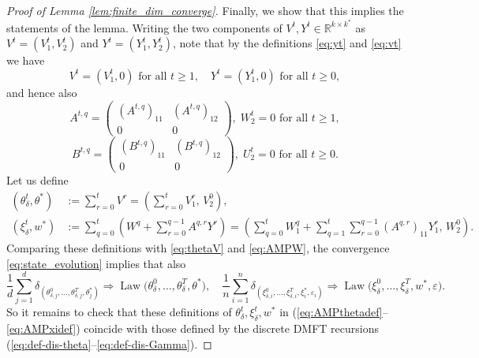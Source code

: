 \documentclass[11pt,letterpaper,reqno]{amsart}
\theoremstyle{definition}
\def\eps{\varepsilon}
\def\R{\mathbb{R}}
\def\Law{\operatorname{Law}}
\begin{document}
\begin{proof}[Proof of Lemma \ref{lem:finite_dim_converge}]
Finally, we show that this implies the statements of the lemma.
Writing the two components of $V^t,Y^t \in \R^{k \times k^*}$ as
$V^t=(V_1^t,V_2^t)$ and $Y^t=(Y_1^t,Y_2^t)$, note that by the definitions
\eqref{eq:yt} and \eqref{eq:vt} we have
\[V^t=(V_1^t,0) \text{ for all } t \geq 1,
\quad Y^t=(Y_1^t,0) \text{ for all } t \geq 0,\]
and hence also
\[A^{t,q}=\begin{pmatrix} (A^{t,q})_{11} & (A^{t,q})_{12} \\
0 & 0 \end{pmatrix}, \; W_2^t=0 \text{ for all } t \geq 1,\]
\[B^{t,q}=\begin{pmatrix} (B^{t,q})_{11} & (B^{t,q})_{12} \\
0 & 0 \end{pmatrix}, \; U_2^t=0 \text{ for all } t \geq 0.\]
Let us define
\begin{align}
(\theta_\delta^t,\theta^*)&:=\sum_{r=0}^t V^r
=\left(\sum_{r=0}^t V_1^r,\,V_2^0\right),\label{eq:AMPthetadef}\\
(\xi_\delta^t,w^*)&:=\sum_{q=0}^t \left(W^q+\sum_{r=0}^{q-1}
A^{q,r}Y^r\right)
=\left(\sum_{q=0}^t W_1^q+\sum_{q=1}^t \sum_{r=0}^{q-1} (A^{q,r})_{11}Y_1^r,\,
W_2^0\right).\label{eq:AMPxidef}
\end{align}
Comparing these definitions with
\eqref{eq:thetaV} and \eqref{eq:AMPW}, the convergence
\eqref{eq:state_evolution} implies that also
\begin{equation}\label{eq:AMPDMFTlimits}
\frac{1}{d}\sum_{j=1}^d \delta_{(\theta^0_{\delta,j}, \ldots,
\theta^T_{\delta,j},\theta^\ast_j)} \Rightarrow
\Law\big(\theta^0_\delta,\ldots, \theta^T_\delta,\theta^\ast\big),
\quad \frac{1}{n}\sum_{i=1}^n \delta_{(\xi^0_{\delta,i}, \ldots,
\xi^T_{\delta,i},\xi_i^*,\eps_i)}
\Rightarrow \Law\big(\xi^0_\delta,\ldots,\xi^T_\delta,w^*,\eps\big).
\end{equation}
So it remains to check that these definitions of
$\theta_\delta^t,\xi_\delta^t,w^*$ in (\ref{eq:AMPthetadef}--\ref{eq:AMPxidef})
coincide with those defined by the discrete DMFT recursions
(\ref{eq:def-dis-theta}--\ref{eq:def-dis-Gamma}).


\end{proof}
\end{document}
